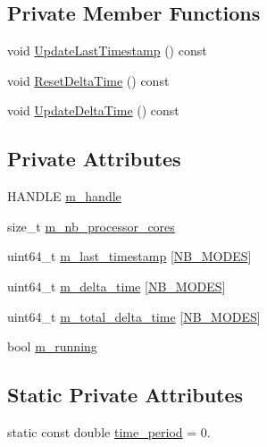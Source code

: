 \subsection*{Private Member Functions}
\begin{DoxyCompactItemize}
\item 
void \hyperlink{classmage_1_1_c_p_u_timer_a1e81db9e1df52fbdf89b042b3611cd80}{Update\+Last\+Timestamp} () const
\item 
void \hyperlink{classmage_1_1_c_p_u_timer_a31f7b301c60a2ea63abfc2d39e8bf96b}{Reset\+Delta\+Time} () const
\item 
void \hyperlink{classmage_1_1_c_p_u_timer_afd5e90ee6e0ad80257bbf6babc440f3b}{Update\+Delta\+Time} () const
\end{DoxyCompactItemize}
\subsection*{Private Attributes}
\begin{DoxyCompactItemize}
\item 
H\+A\+N\+D\+LE \hyperlink{classmage_1_1_c_p_u_timer_a95b8ac18c050ed25293c8a923087369a}{m\+\_\+handle}
\item 
size\+\_\+t \hyperlink{classmage_1_1_c_p_u_timer_ac5fdb38a70c74815231b5efd8d746be1}{m\+\_\+nb\+\_\+processor\+\_\+cores}
\item 
uint64\+\_\+t \hyperlink{classmage_1_1_c_p_u_timer_a6ff1dc5a56461359a699ba8b17d636a8}{m\+\_\+last\+\_\+timestamp} \mbox{[}\hyperlink{classmage_1_1_c_p_u_timer_a17f6aa71c97aef46fea51190709e4c14ab63e6023ec0bea89568ebb2b98728b77}{N\+B\+\_\+\+M\+O\+D\+ES}\mbox{]}
\item 
uint64\+\_\+t \hyperlink{classmage_1_1_c_p_u_timer_a7b7710e7f3b165283fad15eb0c93b96a}{m\+\_\+delta\+\_\+time} \mbox{[}\hyperlink{classmage_1_1_c_p_u_timer_a17f6aa71c97aef46fea51190709e4c14ab63e6023ec0bea89568ebb2b98728b77}{N\+B\+\_\+\+M\+O\+D\+ES}\mbox{]}
\item 
uint64\+\_\+t \hyperlink{classmage_1_1_c_p_u_timer_aa4b96eea0eb0cc3e5d5a4bb7a343a4f6}{m\+\_\+total\+\_\+delta\+\_\+time} \mbox{[}\hyperlink{classmage_1_1_c_p_u_timer_a17f6aa71c97aef46fea51190709e4c14ab63e6023ec0bea89568ebb2b98728b77}{N\+B\+\_\+\+M\+O\+D\+ES}\mbox{]}
\item 
bool \hyperlink{classmage_1_1_c_p_u_timer_a7190afa453085b7bbd7cb76ff6bb62f2}{m\+\_\+running}
\end{DoxyCompactItemize}
\subsection*{Static Private Attributes}
\begin{DoxyCompactItemize}
\item 
static const double \hyperlink{classmage_1_1_c_p_u_timer_a9ff7683150a07f2040b660fc3775337b}{time\+\_\+period} = 0.
\end{DoxyCompactItemize}


